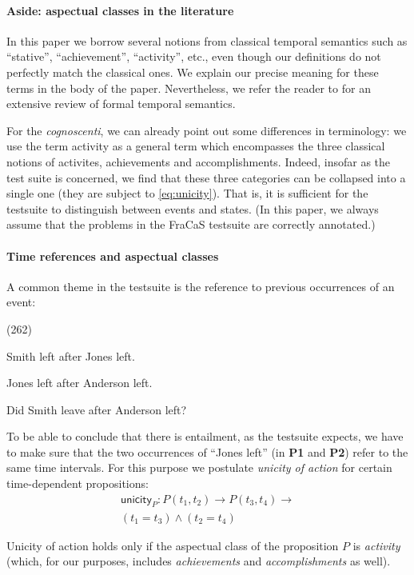 \documentclass[11pt,a4paper]{article}
\newcommand\hyp{\item[H]}
\newcommand\fracasex[2]{\begin{lingex}\item[(#1)] \begin{subex} #2 \end{subex} \end{lingex} }
\newcommand\constant[1]{\mathsf{#1}}
\begin{document}
\paragraph{Aside: aspectual classes in the literature}
In this paper we borrow several notions from classical temporal
semantics such as ``stative'', ``achievement'', ``activity'', etc.,
even though our definitions do not perfectly match the classical
ones. We explain our precise meaning for these terms in the body of the
paper. Nevertheless, we refer the reader to \citet{steedman_productions_2000} for
an extensive review of formal temporal semantics.

For the \textit{cognoscenti}, we can already point out some
differences in terminology: we use the term activity as a general term
which encompasses the three classical notions of activites,
achievements and accomplishments. Indeed, insofar as the test suite is
concerned, we find that these three categories can be collapsed into a
single one (they are subject to \cref{eq:unicity}).  That is, it is
sufficient for the testsuite to distinguish between events and
states. (In this paper, we always assume that the problems in the
FraCaS testsuite are correctly annotated.)

\paragraph{Time references and aspectual classes}

A common theme in the testsuite is the reference to previous
occurrences of an event:

\fracasex{262}{
\item	Smith left after Jones left.
\item	Jones left after Anderson left.
\hyp 	Did Smith leave after Anderson left?
}

To be able to conclude that there is entailment, as the testsuite expects, we have to make sure
that the two occurrences of ``Jones left'' (in \textbf{P1} and \textbf{P2}) refer to the
same time intervals.
%
For this purpose we postulate \emph{unicity of action} for certain time-dependent
propositions:
%
  \vspace{-1.5ex}
\begin{multline}
  \constant{unicity}_P : P (t_1,t_2) → P (t_3,t_4) → \\ (t_1 = t_3) ∧ (t_2 = t_4)
  \label{eq:unicity}
\end{multline}

Unicity of action holds only if the aspectual class of the proposition
$P$ is \emph{activity}~\citep{steedman_productions_2000} (which, for our
purposes, includes \emph{achievements} and \emph{accomplishments} as well).
\end{document}
